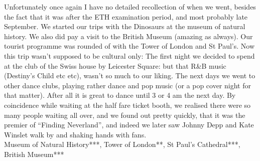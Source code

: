 Unfortunately once again I have no detailed recollection of when we went, besides the fact that it was after the ETH examination period, and most probably late September. We started our trips with the Dinosaurs at the museum of natural history. We also did pay a visit to the British Museum (amazing as always). Our tourist programme was rounded of with the Tower of London and St Paul's. Now this trip wasn't supposed to be cultural only: The first night we decided to spend at the club of the Swiss house by Leicester Square: but that R\&B music (Destiny's Child etc etc), wasn't so much to our liking. The next days we went to other dance clubs, playing rather dance and pop music (or a pop cover night for that matter). After all it is great to dance until 3 or 4 am the next day. By coincidence while waiting at the half fare ticket booth, we realised there were so many people waiting all over, and we found out pretty quickly, that it was the premier of ``Finding Neverland'', and indeed we later saw Johnny Depp and Kate Winslet walk by and shaking hands with fans.\\

Museum of Natural History***, Tower of London**, St Paul's Cathedral***, British Museum***
